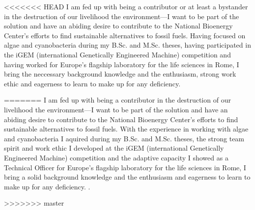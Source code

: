 \documentclass[11pt,a4paper,sans]{moderncv}
\date{\today}
\begin{document}
     
\makelettertitle
\begin{spacing}{1.15}

<<<<<<< HEAD
I am fed up with being a contributor or at least a bystander in the destruction of our livelihood the environment---I want to be part of the solution and have an abiding desire to contribute to the National Bioenergy Center's efforts to find sustainable alternatives to fossil fuels. %
Having focused on algae and cyanobacteria during my B.Sc. and M.Sc. theses, having participated in the iGEM (international Genetically Engineered Machine) competition and having worked for Europe's flagship laboratory for the life sciences in Rome, I bring the neccessary background knowledge and the enthusiasm, strong work ethic and eagerness to learn to make up for any deficiency.%
\par\vspace*{1mm}
=======
I am fed up with being a contributor in the destruction of our livelihood the environment---I want to be part of the solution and have an abiding desire to contribute to the National Bioenergy Center's efforts to find sustainable alternatives to fossil fuels. 
With the experience in working with algae and cyanobacteria I aquired during my B.Sc. and M.Sc. theses, the strong team spirit and work ethic I developed at the iGEM (international Genetically Engineered Machine) competition and the adaptive capacity I showed as a Technical Officer for Europe's flagship laboratory for the life sciences in Rome, I bring a solid background knowledge and the enthusiasm and eagerness to learn to make up for any deficiency. .\par\vspace*{1mm}
>>>>>>> master


\end{spacing}
\end{document}
